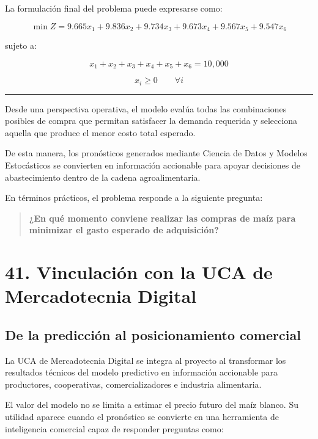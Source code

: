 \documentclass[11pt]{article}
\begin{document}
La formulación final del problema puede expresarse como:

\[
\min Z =
9.665x_1 +
9.836x_2 +
9.734x_3 +
9.673x_4 +
9.567x_5 +
9.547x_6
\]

sujeto a:

\[
x_1+x_2+x_3+x_4+x_5+x_6=10,000
\]

\[
x_i \geq 0
\qquad
\forall i
\]

\begin{center}\rule{0.5\linewidth}{0.5pt}\end{center}

Desde una perspectiva operativa, el modelo evalúa todas las
combinaciones posibles de compra que permitan satisfacer la demanda
requerida y selecciona aquella que produce el menor costo total
esperado.

De esta manera, los pronósticos generados mediante Ciencia de Datos y
Modelos Estocásticos se convierten en información accionable para apoyar
decisiones de abastecimiento dentro de la cadena agroalimentaria.

En términos prácticos, el problema responde a la siguiente pregunta:

\begin{quote}
\textbf{¿En qué momento conviene realizar las compras de maíz para
minimizar el gasto esperado de adquisición?}
\end{quote}

    \hypertarget{vinculaciuxf3n-con-la-uca-de-mercadotecnia-digital}{%
\section{41. Vinculación con la UCA de Mercadotecnia
Digital}\label{vinculaciuxf3n-con-la-uca-de-mercadotecnia-digital}}

\hypertarget{de-la-predicciuxf3n-al-posicionamiento-comercial}{%
\subsection{De la predicción al posicionamiento
comercial}\label{de-la-predicciuxf3n-al-posicionamiento-comercial}}

La UCA de Mercadotecnia Digital se integra al proyecto al transformar
los resultados técnicos del modelo predictivo en información accionable
para productores, cooperativas, comercializadores e industria
alimentaria.

El valor del modelo no se limita a estimar el precio futuro del maíz
blanco. Su utilidad aparece cuando el pronóstico se convierte en una
herramienta de inteligencia comercial capaz de responder preguntas como:
\end{document}
